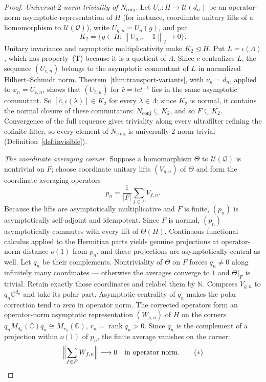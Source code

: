 \documentclass[11pt]{amsart}
\theoremstyle{definition}
\theoremstyle{remark}
\theoremstyle{plain}
\newcommand{\C}{\mathbb C}
\newcommand{\N}{\mathbb N}
\newcommand{\U}{\mathcal U}
\newcommand{\hsnorm}[1]{\left\lVert #1\right\rVert_{2}}
\begin{document}
\begin{proof}
\emph{Universal $2$-norm triviality of $N_{\mathrm{conj}}$.}  Let
$U_n\colon H\to\U(d_n)$ be an operator-norm asymptotic representation
of $H$ (for instance, coordinate unitary lifts of a homomorphism to
$\U(\mathcal Q)$), write $U_{g,n}=U_n(g)$, and put
\[
  K_2=\{g\in H:\hsnorm{U_{g,n}-1}\longrightarrow0\}.
\]
Unitary invariance and asymptotic multiplicativity make
$K_2\trianglelefteq H$.  Put $L=\iota(\Lambda)$, which has
property~\textup{(T)} because it is a quotient of $\Lambda$.
Since $c$ centralizes $L$, the sequence $(U_{c,n})$ belongs to the
asymptotic commutant of $L$ in normalized Hilbert--Schmidt norm.
Theorem~\ref{thm:transport-variants}, with $\nu_n=d_n$, applied to
$x_n=U_{c,n}$, shows
that $(U_{\hat c,n})$ for $\hat c=tct^{-1}$ lies in the same asymptotic
commutant.  So
$[\hat c,\iota(\lambda)]\in K_2$ for every $\lambda\in\Lambda$; since
$K_2$ is normal, it contains the normal closure of these commutators:
$N_{\mathrm{conj}}\subseteq K_2$, and so $F\subseteq K_2$.
Convergence of the full sequence gives triviality along every
ultrafilter refining the cofinite filter, so every element of
$N_{\mathrm{conj}}$ is universally $2$-norm trivial
(Definition~\ref{def:invisible}).

\emph{The coordinate averaging corner.}  Suppose a homomorphism $\Theta$ to $\U(\mathcal Q)$ is nontrivial on $F$; choose coordinate unitary
lifts $(V_{g,n})$ of $\Theta$ and form the coordinate averaging operators
\[
 p_n=\frac1{|F|}\sum_{f\in F}V_{f,n}.
\]
Because the lifts are asymptotically multiplicative and $F$ is finite,
$(p_n)$ is asymptotically self-adjoint and idempotent.  Since $F$ is
normal, $(p_n)$ asymptotically commutes with every lift of
$\Theta(H)$.  Continuous functional calculus applied to the Hermitian
parts yields genuine projections at operator-norm distance $o(1)$ from
$p_n$, and these projections are asymptotically central as well.
Let $q_n$ be their complements.  Nontriviality of
$\Theta$ on $F$ forces $q_n\ne0$ along infinitely many coordinates ---
otherwise the averages converge to $1$ and $\Theta|_F$ is trivial.
Retain exactly those coordinates and relabel them by $\N$.  Compress
$V_{g,n}$ to $q_n\mathbb C^{d_n}$ and take its polar part.  Asymptotic
centrality of $q_n$ makes the polar correction tend to zero in operator
norm.  The corrected operators form an operator-norm asymptotic
representation $(W_{g,n})$ of $H$ on the corners
$q_nM_{d_n}(\C)q_n\cong M_{r_n}(\C)$, $r_n=\operatorname{rank}q_n>0$.
Since $q_n$ is the complement of a projection within $o(1)$ of $p_n$,
the finite average vanishes on the corner:
\[
 \Bigl\lVert\sum_{f\in F}W_{f,n}\Bigr\rVert\longrightarrow0
 \quad\text{in operator norm.}
 \tag{\ensuremath{\ast}}
\]


\end{proof}
\end{document}
